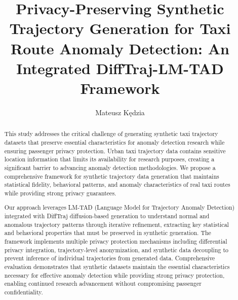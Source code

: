 \documentclass[runningheads]{llncs}
\begin{document}

\title{Privacy-Preserving Synthetic Trajectory Generation for Taxi Route Anomaly Detection: An Integrated DiffTraj-LM-TAD Framework}
\author{Mateusz K{\k e}dzia}
\maketitle

\begin{abstract}
  This study addresses the critical challenge of generating synthetic taxi trajectory datasets that preserve essential characteristics for anomaly detection research while ensuring passenger privacy protection. Urban taxi trajectory data contains sensitive location information that limits its availability for research purposes, creating a significant barrier to advancing anomaly detection methodologies. We propose a comprehensive framework for synthetic trajectory data generation that maintains statistical fidelity, behavioral patterns, and anomaly characteristics of real taxi routes while providing strong privacy guarantees.

  Our approach leverages LM-TAD (Language Model for Trajectory Anomaly Detection) integrated with DiffTraj diffusion-based generation to understand normal and anomalous trajectory patterns through iterative refinement, extracting key statistical and behavioral properties that must be preserved in synthetic generation. The framework implements multiple privacy protection mechanisms including differential privacy integration, trajectory-level anonymization, and synthetic data decoupling to prevent inference of individual trajectories from generated data. Comprehensive evaluation demonstrates that synthetic datasets maintain the essential characteristics necessary for effective anomaly detection while providing strong privacy protection, enabling continued research advancement without compromising passenger confidentiality.

\end{abstract}

\newpage



\end{document}
